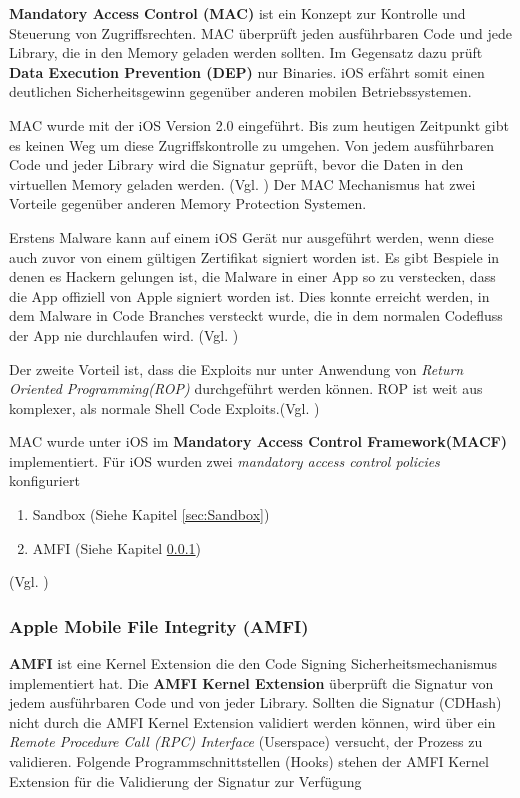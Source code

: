  \textbf{Mandatory Access Control (MAC)} ist ein Konzept zur Kontrolle und Steuerung von Zugriffsrechten. MAC überprüft jeden ausführbaren Code und jede Library, die in den Memory geladen werden sollten. Im Gegensatz dazu prüft \textbf{Data Execution Prevention (DEP)} nur Binaries. iOS erfährt somit einen deutlichen Sicherheitsgewinn gegenüber anderen mobilen Betriebssystemen. \par 
 MAC wurde mit der iOS Version 2.0 eingeführt. Bis zum heutigen Zeitpunkt gibt es keinen Weg um diese Zugriffskontrolle zu umgehen. Von jedem ausführbaren Code und jeder Library wird die Signatur geprüft, bevor die Daten in den virtuellen Memory geladen werden. (Vgl. \cite{iOSSec[5], Hacking[1]})
Der MAC Mechanismus hat zwei Vorteile gegenüber anderen Memory Protection Systemen. \par 
Erstens Malware kann auf einem iOS Gerät nur ausgeführt werden, wenn diese auch zuvor von einem gültigen Zertifikat signiert worden ist. Es gibt Bespiele in denen es Hackern gelungen ist, die Malware in einer App so zu verstecken, dass die App offiziell von Apple signiert worden ist. Dies konnte erreicht werden, in dem Malware in Code Branches versteckt wurde, die in dem normalen Codefluss der App nie durchlaufen wird. (Vgl. \cite{iOSSec[5], Hacking[1]}) \par
 Der zweite Vorteil ist, dass die Exploits nur unter Anwendung von \textit{ \glqq Return Oriented Programming(ROP)\grqq{} } durchgeführt werden können. ROP ist weit aus komplexer, als normale Shell Code Exploits.(Vgl. \cite{Architecture[1], Architecture[2], Architecture[3], ROP[1], ROP[2], iOSSec[5], Hacking[1]})

MAC wurde unter iOS im \textbf{Mandatory Access Control Framework(MACF)} implementiert. Für iOS wurden zwei \textit{\glqq mandatory access control policies\grqq{}} konfiguriert
\begin{enumerate}
   \item Sandbox (Siehe Kapitel \ref{sec:Sandbox})
   \item AMFI (Siehe Kapitel \ref{sec:AMFI})
\end{enumerate}
(Vgl. \cite{iOSSec[5], Hacking[1]})

\subsubsection{Apple Mobile File Integrity (AMFI)}
\label{sec:AMFI}
\textbf{AMFI } ist eine Kernel Extension die den Code Signing Sicherheitsmechanismus implementiert hat. Die \textbf{AMFI Kernel Extension} überprüft die Signatur von jedem ausführbaren Code und von jeder Library. Sollten die Signatur (CDHash) nicht durch die AMFI Kernel Extension validiert werden können, wird über ein \textit{\glqq Remote Procedure Call (RPC) Interface\grqq{}} (Userspace) versucht, der Prozess zu validieren. Folgende Programmschnittstellen (Hooks) stehen der AMFI Kernel Extension für die Validierung der Signatur zur Verfügung


